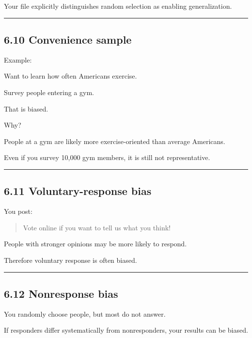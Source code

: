 \documentclass[
]{article}
\begin{document}
Your file explicitly distinguishes random selection as enabling
generalization.

\begin{center}\rule{0.5\linewidth}{0.5pt}\end{center}

\subsection{6.10 Convenience sample}\label{convenience-sample}

Example:

Want to learn how often Americans exercise.

Survey people entering a gym.

That is biased.

Why?

People at a gym are likely more exercise-oriented than average
Americans.

Even if you survey 10,000 gym members, it is still not representative.

\begin{center}\rule{0.5\linewidth}{0.5pt}\end{center}

\subsection{6.11 Voluntary-response bias}\label{voluntary-response-bias}

You post:

\begin{quote}
Vote online if you want to tell us what you think!
\end{quote}

People with stronger opinions may be more likely to respond.

Therefore voluntary response is often biased.

\begin{center}\rule{0.5\linewidth}{0.5pt}\end{center}

\subsection{6.12 Nonresponse bias}\label{nonresponse-bias}

You randomly choose people, but most do not answer.

If responders differ systematically from nonresponders, your results can
be biased.
\end{document}
